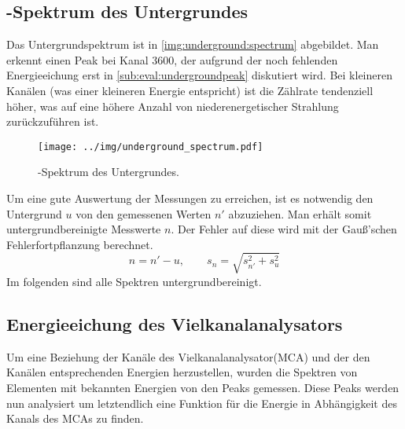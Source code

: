 \subsection{\textgamma-Spektrum des Untergrundes}
Das Untergrundspektrum ist in \autoref{img:underground:spectrum} abgebildet. Man erkennt einen Peak bei Kanal 3600, der aufgrund der noch 
fehlenden Energieeichung erst in \ref{sub:eval:undergroundpeak} diskutiert wird. Bei kleineren Kanälen (was einer kleineren Energie entspricht) ist 
die Zählrate tendenziell höher, was auf eine höhere Anzahl von niederenergetischer Strahlung zurückzuführen ist. 
\begin{figure}[H]
\begin{center}
  \texttt{[image: ../img/underground\_spectrum.pdf]}
  \caption{\textgamma-Spektrum des Untergrundes.}
  \label{img:underground:spectrum}
\end{center}
\end{figure}
Um eine gute Auswertung der Messungen zu erreichen, ist es notwendig den Untergrund $u$ von den gemessenen Werten $n'$ abzuziehen. Man erhält 
somit untergrundbereinigte Messwerte $n$. Der Fehler auf diese wird mit der Gauß'schen Fehlerfortpflanzung berechnet.
\begin{equation}
  n = n' - u, \qquad s_n = \sqrt{s_{n'}^2 + s_u^2}
\end{equation}
Im folgenden sind alle Spektren untergrundbereinigt.

\subsection{Energieeichung des Vielkanalanalysators}
Um eine Beziehung der Kanäle des Vielkanalanalysator(MCA) und der den Kanälen entsprechenden Energien herzustellen, wurden die Spektren von Elementen 
mit bekannten Energien von den Peaks gemessen. Diese Peaks werden nun analysiert um letztendlich eine Funktion für die Energie in Abhängigkeit des 
Kanals des MCAs zu finden.
